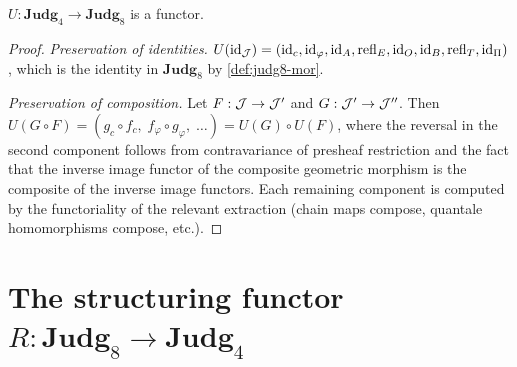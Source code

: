 \begin{proposition}
\label{prop:U-functor}
$U : \mathbf{Judg}_4 \to \mathbf{Judg}_8$ is a functor.
\end{proposition}

\begin{proof}
\emph{Preservation of identities.}
$U(\mathrm{id}_{\mathcal{J}}) = (\mathrm{id}_c, \mathrm{id}_\varphi, \mathrm{id}_A, \mathrm{refl}_E,
\mathrm{id}_O, \mathrm{id}_B, \mathrm{refl}_T, \mathrm{id}_\Pi)$,
which is the identity in $\mathbf{Judg}_8$ by
\cref{def:judg8-mor}.

\emph{Preservation of composition.}
Let $F : \mathcal{J} \to \mathcal{J}'$ and $G : \mathcal{J}' \to \mathcal{J}''$.  Then
$U(G \circ F) = (g_c \circ f_c,\; f_\varphi \circ g_\varphi,\;
\ldots) = U(G) \circ U(F)$,
where the reversal in the second component follows from
contravariance of presheaf restriction and the fact that the inverse
image functor of the composite geometric morphism is the composite of
the inverse image functors.  Each remaining component is computed by
the functoriality of the relevant extraction (chain maps compose,
quantale homomorphisms compose, etc.).
\end{proof}

\section{The structuring functor $R : \mathbf{Judg}_8 \to \mathbf{Judg}_4$}
\label{sec:enrichment}

